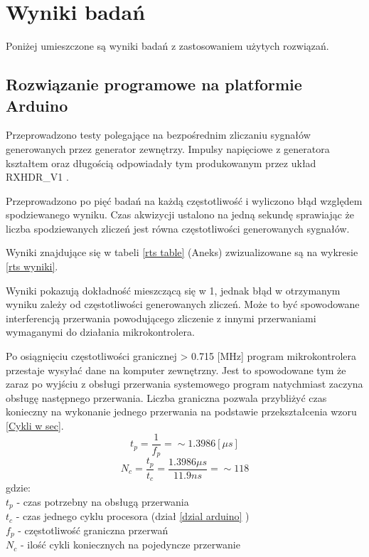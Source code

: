 \section{Wyniki badań}

Poniżej umieszczone są wyniki badań z zastosowaniem użytych rozwiązań. 

\subsection{Rozwiązanie programowe na platformie Arduino}

Przeprowadzono testy polegające na bezpośrednim zliczaniu sygnałów generowanych przez generator zewnętrzy. 
Impulsy napięciowe z generatora kształtem oraz długością odpowiadały tym produkowanym przez układ RXHDR\_V1 \cite{master}.

Przeprowadzono po pięć badań na każdą częstotliwość i wyliczono błąd względem spodziewanego wyniku. 
Czas akwizycji ustalono na jedną sekundę sprawiając że liczba spodziewanych zliczeń jest równa częstotliwości generowanych sygnałów.

Wyniki znajdujące się w tabeli \ref{rts table} (Aneks) zwizualizowane są na wykresie \ref{rts wyniki}.



Wyniki pokazują dokładność mieszczącą się w  1\textperthousand, 
jednak błąd w otrzymanym wyniku zależy od częstotliwości generowanych zliczeń.
Może to być spowodowane interferencją przerwania powodującego zliczenie z innymi przerwaniami wymaganymi do działania mikrokontrolera.

Po osiągnięciu częstotliwości granicznej > 0.715 [MHz] program mikrokontrolera przestaje wysyłać dane na komputer zewnętrzny.
Jest to spowodowane tym że zaraz po wyjściu z obsługi przerwania systemowego program natychmiast zaczyna obsługę następnego przerwania. 
Liczba graniczna pozwala przybliżyć czas konieczny na wykonanie jednego przerwania na podstawie przekształcenia wzoru \ref{Cykli w sec}. 
$$ t_p = \frac{1}{f_p} = \sim 1.3986 [\mu s] $$
$$ N_c = \frac{t_p}{t_c} =  \frac{1.3986 \mu s}{11.9 ns} =\sim 118$$
gdzie: \\
        \indent $t_p$ -  czas potrzebny na obsługą przerwania\\
        \indent $t_c$ -  czas jednego cyklu procesora (dział \ref{dzial arduino} ) \\
        \indent $f_p$ -  częstotliwość graniczna przerwań \\
        \indent $N_c$ -  ilość cykli koniecznych na pojedyncze przerwanie \\

